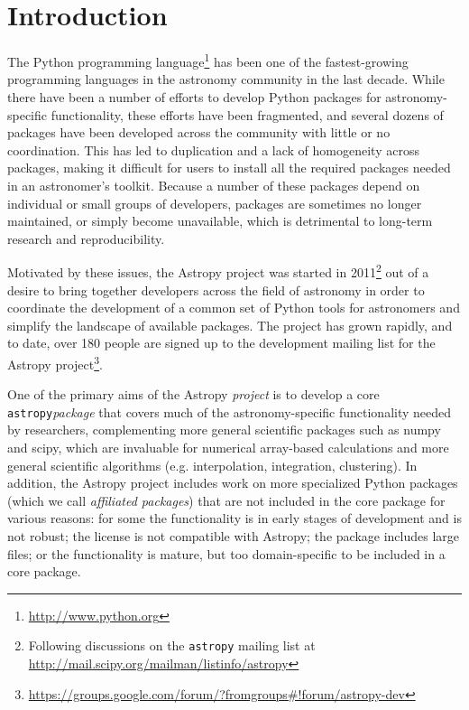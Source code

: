 \documentclass[traditabstract]{aa}
\newcommand{\astropy}{\texttt{astropy}\xspace}
\begin{document}
\maketitle


\section{Introduction}


The Python programming language\footnote{\url{http://www.python.org}} has been
one of the fastest-growing programming languages in the astronomy community in
the last decade. While there have been a number of efforts to develop Python
packages for astronomy-specific functionality, these efforts have been
fragmented, and several dozens of packages have been developed across the
community with little or no coordination. This has led to duplication and a
lack of homogeneity across packages, making it difficult for users to install
all the required packages needed in an astronomer's toolkit. Because a number
of these packages depend on individual or small groups of developers, packages
are sometimes no longer maintained, or simply become unavailable, which is
detrimental to long-term research and reproducibility.

Motivated by these issues, the Astropy project was started in
2011\footnote{Following discussions on the \texttt{astropy} mailing list at
\url{http://mail.scipy.org/mailman/listinfo/astropy}} out of a desire to bring
together developers across the field of astronomy in order to coordinate the
development of a common set of Python tools for astronomers and
simplify the landscape of available packages. The project has grown rapidly,
and to date, over 180 people are signed up to the development mailing list for
the Astropy project\footnote{
\url{https://groups.google.com/forum/?fromgroups#!forum/astropy-dev}}.

One of the primary aims of the Astropy \textit{project} is to develop a core
\astropy \textit{package} that covers much of the astronomy-specific
functionality needed by researchers, complementing more general scientific
packages such as \gls{numpy} and \gls{scipy}, which are invaluable for
numerical array-based calculations and more general scientific algorithms (e.g.
interpolation, integration, clustering). In addition, the Astropy project
includes work on more specialized Python packages (which we call
\textit{affiliated packages}) that are not included in the core package for
various reasons: for some the functionality is in early stages of development
and is not robust; the license is not compatible with Astropy; the package
includes large files; or the functionality is mature, but too domain-specific
to be included in a core package.
\end{document}
